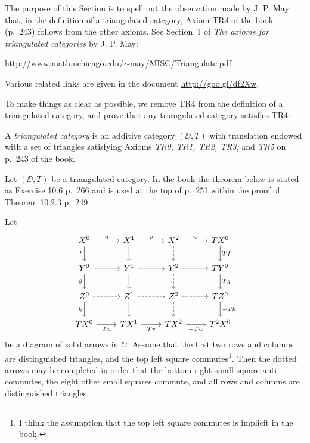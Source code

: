 \documentclass[12pt]{article}
\theoremstyle{remark}
\theoremstyle{definition}
\begin{document}

The purpose of this Section is to spell out the observation made by J. P. May that, in the definition of a triangulated category, Axiom TR4 of the book (p.~243) follows from the other axioms. See Section~1 of {\em The axioms for triangulated categories} by J. P. May:  
%
\begin{center}\href{http://www.math.uchicago.edu/~may/MISC/Triangulate.pdf}{http://www.math.uchicago.edu/$\sim$may/MISC/Triangulate.pdf} 
\end{center}
%
Various related links are given in the document \href{http://goo.gl/df2Xw}{http://goo.gl/df2Xw}. 

To make things as clear as possible, we remove TR4 from the definition of a triangulated category, and prove that any triangulated category satisfies TR4:

\begin{df} 
A {\em triangulated category} is an additive category $(\DD,T)$ with translation endowed with a set of triangles satisfying Axioms {\em TR0, TR1, TR2, TR3}, and {\em TR5} on p.~243 of the book.
\end{df}

Let $(\DD,T)$ be a triangulated category. In the book the theorem below is stated as Exercise 10.6 p.~266 and is used at the top of p.~251 within the proof of Theorem 10.2.3 p.~249.

\begin{thm}
Let 
$$
\begin{tikzcd}
X^0\ar{r}{u}\ar{d}[swap]{f}&X^1\ar{d}\ar{r}{v}&X^2\ar[dashed]{d}\ar{r}{w}&TX^0\ar{d}{Tf}\\ 
Y^0\ar{r}\ar{d}[swap]{g}&Y^1\ar{d}\ar{r}&Y^2\ar[dashed]{d}\ar{r}&TY^0\ar{d}{Tg}\\ 
Z^0\ar[dashed]{r}\ar{d}[swap]{h}&Z^1\ar{d}\ar[dashed]{r}&Z^2\ar[dashed]{d}\ar[dashed]{r}&TZ^0\ar{d}{-Th}\\ 
TX^0\ar{r}[swap]{Tu}&TX^1\ar{r}[swap]{Tv}&TX^2\ar{r}[swap]{-Tw}&T^2X^0 
\end{tikzcd}
$$ 
be a diagram of solid arrows in $\DD$. Assume that the first two rows and columns are distinguished triangles, and the top left square commutes\footnote{I think the assumption that the top left square commutes is implicit in the book.}. Then the dotted arrows may be completed in order that the bottom right small square anti-commutes, the eight other small squares commute, and all rows and columns are distinguished triangles. 
\end{thm}
\end{document}
